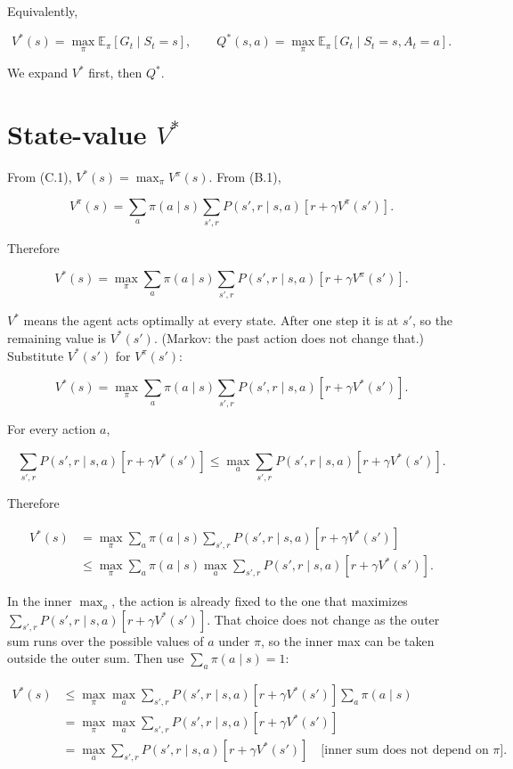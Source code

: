 Equivalently,

\[
V^*(s)
=
\max_\pi
\mathbb{E}_\pi[G_t \mid S_t=s],
\qquad
Q^*(s,a)
=
\max_\pi
\mathbb{E}_\pi[G_t \mid S_t=s, A_t=a].
\]

We expand $V^*$ first, then $Q^*$.

\section{State-value $V^*$}

From (C.1), $V^*(s)=\max_\pi V^\pi(s)$. From (B.1),

\[
V^\pi(s)
=
\sum_a \pi(a \mid s)
\sum_{s',r}
P(s',r \mid s,a)
\left[
r + \gamma V^\pi(s')
\right].
\]

Therefore

\[
V^*(s)
=
\max_\pi
\sum_a \pi(a \mid s)
\sum_{s',r}
P(s',r \mid s,a)
\left[
r + \gamma V^\pi(s')
\right].
\]

$V^*$ means the agent acts optimally at every state. After one step it is at $s'$, so the remaining value is $V^*(s')$. (Markov: the past action does not change that.) Substitute $V^*(s')$ for $V^\pi(s')$:

\[
V^*(s)
=
\max_\pi
\sum_a \pi(a \mid s)
\sum_{s',r}
P(s',r \mid s,a)
\left[
r + \gamma V^*(s')
\right].
\]

For every action $a$,

\[
\sum_{s',r}
P(s',r \mid s,a)
\left[
r + \gamma V^*(s')
\right]
\le
\max_a
\sum_{s',r}
P(s',r \mid s,a)
\left[
r + \gamma V^*(s')
\right].
\]

Therefore

\[
\begin{aligned}
V^*(s)
&=
\max_\pi
\sum_a \pi(a \mid s)
\sum_{s',r}
P(s',r \mid s,a)
\left[
r + \gamma V^*(s')
\right] \\
&\le
\max_\pi
\sum_a \pi(a \mid s)
\max_a
\sum_{s',r}
P(s',r \mid s,a)
\left[
r + \gamma V^*(s')
\right].
\end{aligned}
\]

In the inner $\max_a$, the action is already fixed to the one that maximizes $\sum_{s',r}P(s',r\mid s,a)[r+\gamma V^*(s')]$. That choice does not change as the outer sum runs over the possible values of $a$ under $\pi$, so the inner max can be taken outside the outer sum. Then use $\sum_a \pi(a \mid s)=1$:

\[
\begin{aligned}
V^*(s)
&\le
\max_\pi
\max_a
\sum_{s',r}
P(s',r \mid s,a)
\left[
r + \gamma V^*(s')
\right]
\sum_a \pi(a \mid s) \\
&=
\max_\pi
\max_a
\sum_{s',r}
P(s',r \mid s,a)
\left[
r + \gamma V^*(s')
\right] \\
&=
\max_a
\sum_{s',r}
P(s',r \mid s,a)
\left[
r + \gamma V^*(s')
\right]
\quad\text{[inner sum does not depend on $\pi$]}.
\end{aligned}
\]

